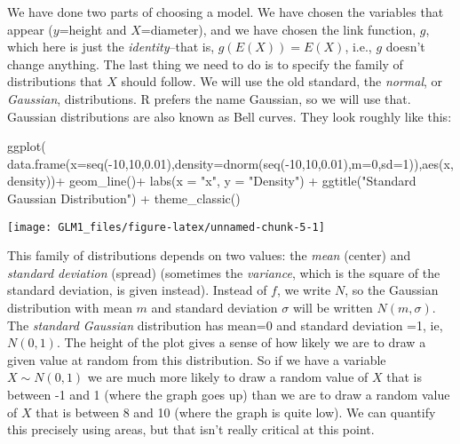 \documentclass[
]{article}
\newenvironment{Shaded}{\begin{snugshade}}{\end{snugshade}}
\newcommand{\AttributeTok}[1]{\textcolor[rgb]{0.77,0.63,0.00}{#1}}
\newcommand{\DecValTok}[1]{\textcolor[rgb]{0.00,0.00,0.81}{#1}}
\newcommand{\FloatTok}[1]{\textcolor[rgb]{0.00,0.00,0.81}{#1}}
\newcommand{\FunctionTok}[1]{\textcolor[rgb]{0.00,0.00,0.00}{#1}}
\newcommand{\NormalTok}[1]{#1}
\newcommand{\SpecialCharTok}[1]{\textcolor[rgb]{0.00,0.00,0.00}{#1}}
\newcommand{\StringTok}[1]{\textcolor[rgb]{0.31,0.60,0.02}{#1}}
\begin{document}
We have done two parts of choosing a model. We have chosen the variables
that appear (\(y\)=height and \(X\)=diameter), and we have chosen the
link function, \(g\), which here is just the \emph{identity}--that is,
\(g(E(X)) = E(X)\), i.e., \(g\) doesn't change anything. The last thing
we need to do is to specify the family of distributions that \(X\)
should follow. We will use the old standard, the \emph{normal}, or
\emph{Gaussian}, distributions. R prefers the name Gaussian, so we will
use that. Gaussian distributions are also known as Bell curves. They
look roughly like this:

\begin{Shaded}
\begin{Highlighting}[]
\FunctionTok{ggplot}\NormalTok{(}
  \FunctionTok{data.frame}\NormalTok{(}\AttributeTok{x=}\FunctionTok{seq}\NormalTok{(}\SpecialCharTok{{-}}\DecValTok{10}\NormalTok{,}\DecValTok{10}\NormalTok{,}\FloatTok{0.01}\NormalTok{),}\AttributeTok{density=}\FunctionTok{dnorm}\NormalTok{(}\FunctionTok{seq}\NormalTok{(}\SpecialCharTok{{-}}\DecValTok{10}\NormalTok{,}\DecValTok{10}\NormalTok{,}\FloatTok{0.01}\NormalTok{),}\AttributeTok{m=}\DecValTok{0}\NormalTok{,}\AttributeTok{sd=}\DecValTok{1}\NormalTok{)),}\FunctionTok{aes}\NormalTok{(x,density))}\SpecialCharTok{+}
  \FunctionTok{geom\_line}\NormalTok{()}\SpecialCharTok{+}
  \FunctionTok{labs}\NormalTok{(}\AttributeTok{x =} \StringTok{"x"}\NormalTok{, }\AttributeTok{y =} \StringTok{"Density"}\NormalTok{) }\SpecialCharTok{+}
      \FunctionTok{ggtitle}\NormalTok{(}\StringTok{"Standard Gaussian Distribution"}\NormalTok{) }\SpecialCharTok{+}
      \FunctionTok{theme\_classic}\NormalTok{()}
\end{Highlighting}
\end{Shaded}

\begin{center}\texttt{[image: GLM1\_files/figure-latex/unnamed-chunk-5-1]} \end{center}

This family of distributions depends on two values: the \emph{mean}
(center) and \emph{standard deviation} (spread) (sometimes the
\emph{variance}, which is the square of the standard deviation, is given
instead). Instead of \(f\), we write \(N\), so the Gaussian distribution
with mean \(m\) and standard deviation \(\sigma\) will be written
\(N(m,\sigma)\). The \emph{standard Gaussian} distribution has mean=0
and standard deviation =1, ie, \(N(0,1)\). The height of the plot gives
a sense of how likely we are to draw a given value at random from this
distribution. So if we have a variable \(X \sim N(0,1)\) we are much
more likely to draw a random value of \(X\) that is between -1 and 1
(where the graph goes up) than we are to draw a random value of \(X\)
that is between 8 and 10 (where the graph is quite low). We can quantify
this precisely using areas, but that isn't really critical at this
point.
\end{document}
